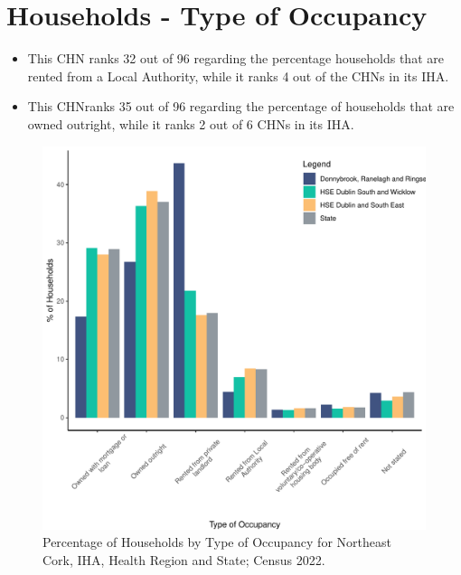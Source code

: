 \documentclass{article}
\begin{document}
\section{Households - Type of Occupancy}\label{sect:Households}
\begin{itemize}
\item This CHN ranks  32 out of 96 regarding the percentage households that are rented from a Local Authority, while it ranks  4 out of the CHNs in its IHA. 
\item This CHNranks  35 out of 96 regarding the percentage of households that are owned outright, while it ranks   2 out of 6 CHNs in its IHA.
\end{itemize}
\begin{figure}[H]
	\centering
	\includegraphics[width = 140mm]{../figures/HouseholdsED.pdf}
	\caption{Percentage of Households by Type of Occupancy for Northeast Cork, IHA, Health Region and State; Census 2022.}
	\label{fig:vbnv}
	\end{figure}
\end{document}
